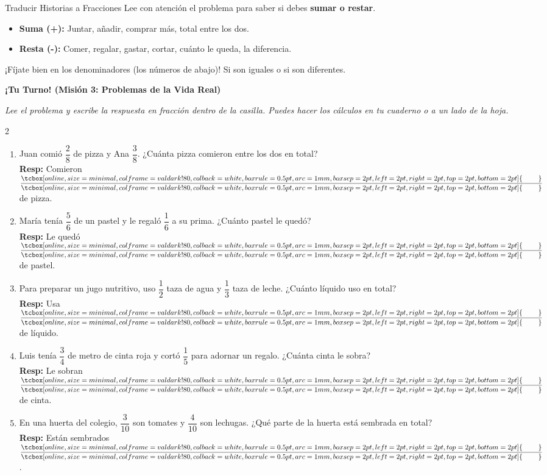 \documentclass[12pt, letterpaper]{article}
\newenvironment{practica}[1]{
	\vspace{0.6cm}
	\begin{tcolorbox}[colback=white, colframe=valdark, boxrule=1pt, borderline west={4pt}{0pt}{valdark!50}, arc=2mm, top=3pt, bottom=3pt]
		\large\bfseries \ding{46} \textbf{¡Tu Turno! (#1)}
	\end{tcolorbox}
	\vspace{0.2cm}
}{
	\vspace{0.4cm}
}
\newcommand{\boxfill}[1][0.6cm]{\tcbox[on line, size=minimal, colframe=valdark!80, colback=white, boxrule=0.5pt, arc=1mm, boxsep=2pt, left=2pt, right=2pt, top=2pt, bottom=2pt]{\makebox[#1]{\vphantom{M}}}}
\begin{document}
	\begin{concepto}{Traducir Historias a Fracciones}
		Lee con atención el problema para saber si debes \textbf{sumar o restar}.
		\begin{itemize}
			\item \textbf{Suma (+):} Juntar, añadir, comprar más, total entre los dos.
			\item \textbf{Resta (-):} Comer, regalar, gastar, cortar, cuánto le queda, la diferencia.
		\end{itemize}
		¡Fíjate bien en los denominadores (los números de abajo)! Si son iguales o si son diferentes.
	\end{concepto}
	\newpage
	\begin{practica}{Misión 3: Problemas de la Vida Real}
		\textit{Lee el problema y escribe la respuesta en fracción dentro de la casilla. Puedes hacer los cálculos en tu cuaderno o a un lado de la hoja.}
		
		\vspace{0.4cm}
		\begin{multicols}{2}
			\raggedcolumns
			\begin{enumerate}[itemsep=1cm, leftmargin=*]
				
				\item Juan comió $\dfrac{2}{8}$ de pizza y Ana $\dfrac{3}{8}$. ¿Cuánta pizza comieron entre los dos en total? \\
				\textbf{Resp:} Comieron $\dfrac{\boxfill[0.8cm]}{\boxfill[0.8cm]}$ de pizza.
				
				\item María tenía $\dfrac{5}{6}$ de un pastel y le regaló $\dfrac{1}{6}$ a su prima. ¿Cuánto pastel le quedó? \\
				\textbf{Resp:} Le quedó $\dfrac{\boxfill[0.8cm]}{\boxfill[0.8cm]}$ de pastel.
				
				\item Para preparar un jugo nutritivo, uso $\dfrac{1}{2}$ taza de agua y $\dfrac{1}{3}$ taza de leche. ¿Cuánto líquido uso en total? \\
				\textbf{Resp:} Usa $\dfrac{\boxfill[0.8cm]}{\boxfill[0.8cm]}$ de líquido.
				
				\item Luis tenía $\dfrac{3}{4}$ de metro de cinta roja y cortó $\dfrac{1}{5}$ para adornar un regalo. ¿Cuánta cinta le sobra? \\
				\textbf{Resp:} Le sobran $\dfrac{\boxfill[0.8cm]}{\boxfill[0.8cm]}$ de cinta.
				
				\item En una huerta del colegio, $\dfrac{3}{10}$ son tomates y $\dfrac{4}{10}$ son lechugas. ¿Qué parte de la huerta está sembrada en total? \\
				\textbf{Resp:} Están sembrados $\dfrac{\boxfill[0.8cm]}{\boxfill[0.8cm]}$.
				

\end{enumerate}
\end{multicols}
\end{practica}
\end{document}
